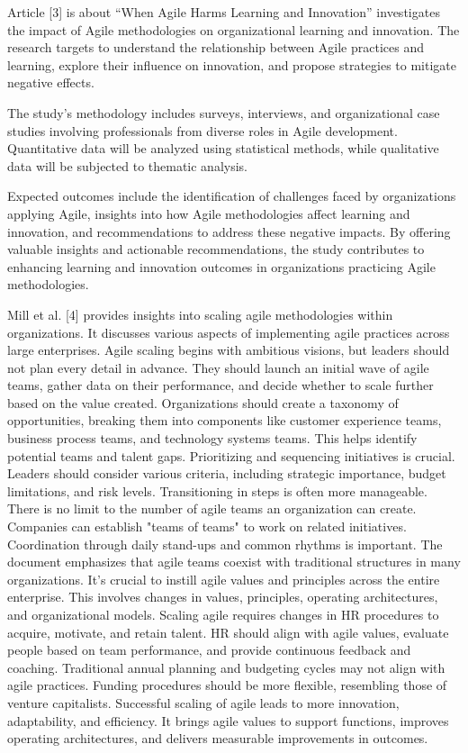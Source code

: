\documentclass[conference]{IEEEtran}
\begin{document}
Article [3] is about “When Agile Harms Learning and Innovation” investigates the impact of Agile methodologies on organizational learning and innovation. The research targets to understand the relationship between Agile practices and learning, explore their influence on innovation, and propose strategies to mitigate negative effects.

The study's methodology includes surveys, interviews, and organizational case studies involving professionals from diverse roles in Agile development. Quantitative data will be analyzed using statistical methods, while qualitative data will be subjected to thematic analysis.

Expected outcomes include the identification of challenges faced by organizations applying Agile, insights into how Agile methodologies affect learning and innovation, and recommendations to address these negative impacts. By offering valuable insights and actionable recommendations, the study contributes to enhancing learning and innovation outcomes in organizations practicing Agile methodologies.

Mill et al. [4] provides insights into scaling agile methodologies within organizations. It discusses various aspects of implementing agile practices across large enterprises. Agile scaling begins with ambitious visions, but leaders should not plan every detail in advance. They should launch an initial wave of agile teams, gather data on their performance, and decide whether to scale further based on the value created. Organizations should create a taxonomy of opportunities, breaking them into components like customer experience teams, business process teams, and technology systems teams. This helps identify potential teams and talent gaps. Prioritizing and sequencing initiatives is crucial. Leaders should consider various criteria, including strategic importance, budget limitations, and risk levels. Transitioning in steps is often more manageable. There is no limit to the number of agile teams an organization can create. Companies can establish "teams of teams" to work on related initiatives. Coordination through daily stand-ups and common rhythms is important. The document emphasizes that agile teams coexist with traditional structures in many organizations. It's crucial to instill agile values and principles across the entire enterprise. This involves changes in values, principles, operating architectures, and organizational models. Scaling agile requires changes in HR procedures to acquire, motivate, and retain talent. HR should align with agile values, evaluate people based on team performance, and provide continuous feedback and coaching. Traditional annual planning and budgeting cycles may not align with agile practices. Funding procedures should be more flexible, resembling those of venture capitalists. Successful scaling of agile leads to more innovation, adaptability, and efficiency. It brings agile values to support functions, improves operating architectures, and delivers measurable improvements in outcomes.
\end{document}
